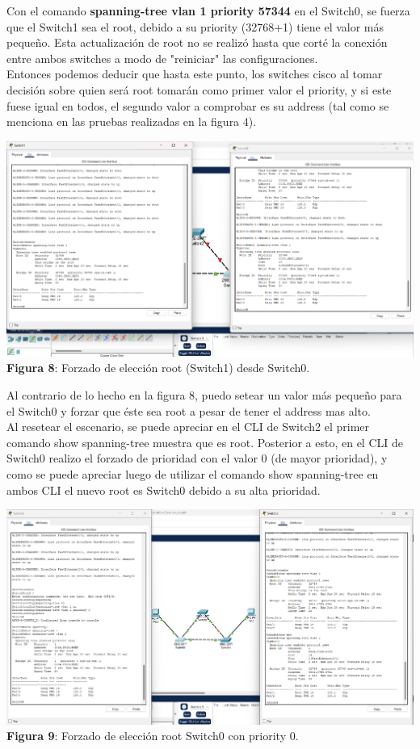 \documentclass{article}
\begin{document}
    Con el comando {\bfseries spanning-tree vlan 1 priority 57344} en el Switch0, se fuerza que el Switch1 sea el root, debido a su priority (32768+1) tiene el valor más pequeño. Esta actualización de root no se realizó hasta que corté la conexión entre ambos switches a modo de "reiniciar" las configuraciones.\\
    Entonces podemos deducir que hasta este punto, los switches cisco al tomar decisión sobre quien será root tomarán como primer valor el priority, y si este fuese igual en todos, el segundo valor a comprobar es su address (tal como se menciona en las pruebas realizadas en la figura 4).

    \begin{center}
        \includegraphics[width=0.825\linewidth]{img_09} 
        \linebreak
        \small {\bfseries Figura 8}: Forzado de elección root (Switch1) desde Switch0.
    \end{center}

    \pagebreak

    Al contrario de lo hecho en la figura 8, puedo setear un valor más pequeño para el Switch0 y forzar que éste sea root a pesar de tener el address mas alto.\\
    Al resetear el escenario, se puede apreciar en el CLI de Switch2 el primer comando show spanning-tree muestra que es root. Posterior a esto, en el CLI de Switch0 realizo el forzado de prioridad con el valor 0 (de mayor prioridad), y como se puede apreciar luego de utilizar el comando show spanning-tree en ambos CLI el nuevo root es Switch0 debido a su alta prioridad.

    \begin{center}
        \includegraphics[width=0.825\linewidth]{img_10} 
        \linebreak
        \small {\bfseries Figura 9}: Forzado de elección root Switch0 con priority 0.
    \end{center}
\end{document}
